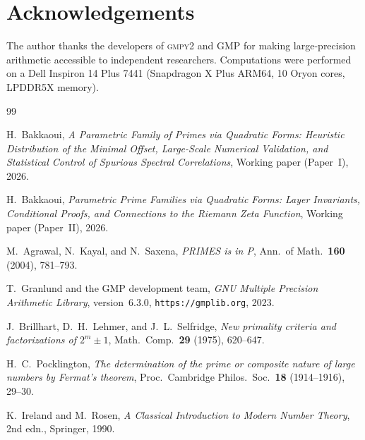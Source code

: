 \documentclass[11pt,a4paper]{article}
\theoremstyle{definition}
\theoremstyle{remark}
\begin{document}
\section*{Acknowledgements}

The author thanks the developers of \textsc{gmpy2} and GMP for making
large-precision arithmetic accessible to independent researchers.
Computations were performed on a Dell Inspiron 14 Plus 7441
(Snapdragon X Plus ARM64, 10 Oryon cores, LPDDR5X memory).

\begin{thebibliography}{99}

H.~Bakkaoui, \emph{A Parametric Family of Primes via Quadratic Forms:
Heuristic Distribution of the Minimal Offset, Large-Scale Numerical
Validation, and Statistical Control of Spurious Spectral Correlations},
Working paper (Paper~I), 2026.

H.~Bakkaoui, \emph{Parametric Prime Families via Quadratic Forms: Layer
Invariants, Conditional Proofs, and Connections to the Riemann Zeta
Function}, Working paper (Paper~II), 2026.

M.~Agrawal, N.~Kayal, and N.~Saxena, \emph{PRIMES is in P},
Ann.\ of Math.\ \textbf{160} (2004), 781--793.

T.~Granlund and the GMP development team,
\emph{GNU Multiple Precision Arithmetic Library}, version~6.3.0,
\texttt{https://gmplib.org}, 2023.

J.~Brillhart, D.~H.~Lehmer, and J.~L.~Selfridge, \emph{New primality
criteria and factorizations of $2^m\pm 1$},
Math.\ Comp.\ \textbf{29} (1975), 620--647.

H.~C.~Pocklington, \emph{The determination of the prime or composite
nature of large numbers by Fermat's theorem},
Proc.\ Cambridge Philos.\ Soc.\ \textbf{18} (1914--1916), 29--30.

K.~Ireland and M.~Rosen, \emph{A Classical Introduction to Modern
Number Theory}, 2nd edn., Springer, 1990.

\end{thebibliography}
\end{document}
